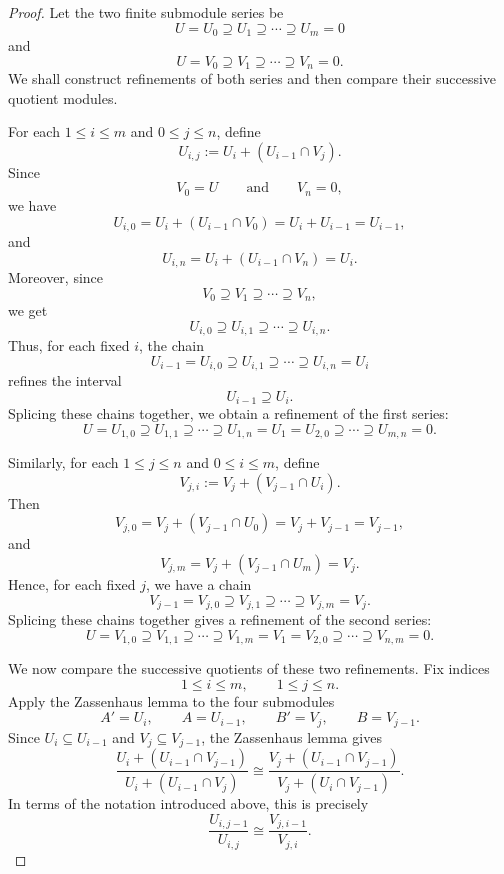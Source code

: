 \begin{proof}
    Let the two finite submodule series be
    \[
        U=U_0\supseteq U_1\supseteq\cdots\supseteq U_m=0
    \]
    and
    \[
        U=V_0\supseteq V_1\supseteq\cdots\supseteq V_n=0.
    \]
    We shall construct refinements of both series and then compare their successive
    quotient modules.

    For each $1\leq i\leq m$ and $0\leq j\leq n$, define
    \[
        U_{i,j}:=U_i+(U_{i-1}\cap V_j).
    \]
    Since
    \[
        V_0=U
        \qquad\text{and}\qquad
        V_n=0,
    \]
    we have
    \[
        U_{i,0}
        =
        U_i+(U_{i-1}\cap V_0)
        =
        U_i+U_{i-1}
        =
        U_{i-1},
    \]
    and
    \[
        U_{i,n}
        =
        U_i+(U_{i-1}\cap V_n)
        =
        U_i.
    \]
    Moreover, since
    \[
        V_0\supseteq V_1\supseteq\cdots\supseteq V_n,
    \]
    we get
    \[
        U_{i,0}\supseteq U_{i,1}\supseteq\cdots\supseteq U_{i,n}.
    \]
    Thus, for each fixed $i$, the chain
    \[
        U_{i-1}=U_{i,0}\supseteq U_{i,1}\supseteq\cdots\supseteq U_{i,n}=U_i
    \]
    refines the interval
    \[
        U_{i-1}\supseteq U_i.
    \]
    Splicing these chains together, we obtain a refinement of the first series:
    \[
        U=U_{1,0}\supseteq U_{1,1}\supseteq\cdots\supseteq U_{1,n}
        =
        U_1=U_{2,0}\supseteq\cdots\supseteq U_{m,n}=0.
    \]

    Similarly, for each $1\leq j\leq n$ and $0\leq i\leq m$, define
    \[
        V_{j,i}:=V_j+(V_{j-1}\cap U_i).
    \]
    Then
    \[
        V_{j,0}
        =
        V_j+(V_{j-1}\cap U_0)
        =
        V_j+V_{j-1}
        =
        V_{j-1},
    \]
    and
    \[
        V_{j,m}
        =
        V_j+(V_{j-1}\cap U_m)
        =
        V_j.
    \]
    Hence, for each fixed $j$, we have a chain
    \[
        V_{j-1}=V_{j,0}\supseteq V_{j,1}\supseteq\cdots\supseteq V_{j,m}=V_j.
    \]
    Splicing these chains together gives a refinement of the second series:
    \[
        U=V_{1,0}\supseteq V_{1,1}\supseteq\cdots\supseteq V_{1,m}
        =
        V_1=V_{2,0}\supseteq\cdots\supseteq V_{n,m}=0.
    \]

    We now compare the successive quotients of these two refinements.
    Fix indices
    \[
        1\leq i\leq m,
        \qquad
        1\leq j\leq n.
    \]
    Apply the Zassenhaus lemma to the four submodules
    \[
        A'=U_i,\qquad A=U_{i-1},
        \qquad
        B'=V_j,\qquad B=V_{j-1}.
    \]
    Since $U_i\subseteq U_{i-1}$ and $V_j\subseteq V_{j-1}$, the Zassenhaus lemma gives
    \[
        \frac{U_i+(U_{i-1}\cap V_{j-1})}
             {U_i+(U_{i-1}\cap V_j)}
        \cong
        \frac{V_j+(U_{i-1}\cap V_{j-1})}
             {V_j+(U_i\cap V_{j-1})}.
    \]
    In terms of the notation introduced above, this is precisely
    \[
        \frac{U_{i,j-1}}{U_{i,j}}
        \cong
        \frac{V_{j,i-1}}{V_{j,i}}.
    \]


\end{proof}
